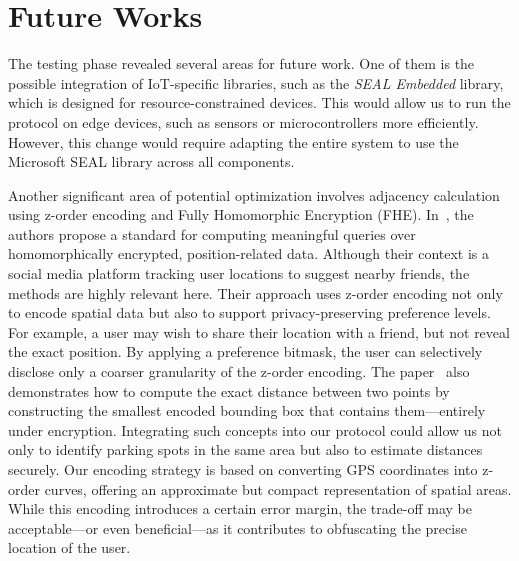 \section{Future Works}

The testing phase revealed several areas for future work. One of them is the possible integration of IoT-specific libraries, such as the \emph{SEAL Embedded} \cite{sealembedded} library, which is designed for resource-constrained devices. This would allow us to run the protocol on edge devices, such as sensors or microcontrollers more efficiently. However, this change would require adapting the entire system to use the Microsoft SEAL\cite{sealcrypto} library across all components.

Another significant area of potential optimization involves adjacency calculation using z-order encoding and Fully Homomorphic Encryption (FHE). In~\cite{zhang2020privacy}, the authors propose a standard for computing meaningful queries over homomorphically encrypted, position-related data. Although their context is a social media platform tracking user locations to suggest nearby friends, the methods are highly relevant here. Their approach uses z-order encoding not only to encode spatial data but also to support privacy-preserving preference levels.
For example, a user may wish to share their location with a friend, but not reveal the exact position. By applying a preference bitmask, the user can selectively disclose only a coarser granularity of the z-order encoding. The paper~\cite{zhang2020privacy} also demonstrates how to compute the exact distance between two points by constructing the smallest encoded bounding box that contains them—entirely under encryption. Integrating such concepts into our protocol could allow us not only to identify parking spots in the same area but also to estimate distances securely.
Our encoding strategy is based on converting GPS coordinates into z-order curves, offering an approximate but compact representation of spatial areas. While this encoding introduces a certain error margin, the trade-off may be acceptable—or even beneficial—as it contributes to obfuscating the precise location of the user.

